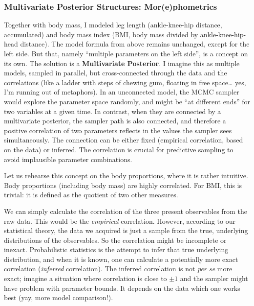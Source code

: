 \subsubsection{Multivariate Posterior Structures: Mor(e)phometrics}
\label{sec:orgf2c37c2}
Together with body mass, I modeled leg length (ankle-knee-hip distance, accumulated) and body mass index (BMI, body mass divided by ankle-knee-hip-head distance).
The model formula from above remains unchanged, except for the left side.
But that, namely ``multiple parameters on the left side'', is a concept on its own.
The solution is a \textbf{Multivariate Posterior}.
I imagine this as multiple models, sampled in parallel, but cross-connected through the data and the correlations (like a ladder with steps of chewing gum, floating in free space\ldots{} yes, I'm running out of metaphors).
In an unconnected model, the MCMC sampler would explore the parameter space randomly, and might be ``at different ends'' for two variables at a given time.
In contrast, when they are connected by a multivariate posterior, the sampler path is also connected, and therefore a positive correlation of two parameters reflects in the values the sampler sees simultaneously.
The connection can be either fixed (empirical correlation, based on the data) or inferred.
The correlation is crucial for predictive sampling to avoid implausible parameter combinations.


Let us rehearse this concept on the body proportions, where it is rather intuitive.
Body proportions (including body mass) are highly correlated.
For BMI, this is trivial: it is defined as the quotient of two other measures.

We can simply calculate the correlation of the three present observables from the raw data.
This would be the \emph{empirical} correlation.
However, according to our statistical theory, the data we acquired is just a sample from the true, underlying distributions of the observables.
So the correlation might be incomplete or inexact.
Probabilistic statistics is the attempt to infer that true underlying distribution, and when it is known, one can calculate a potentially more exact correlation (\emph{inferred} correlation).
The inferred correlation is not \emph{per se} more exact; imagine a situation where correlation is close to \(\pm 1\) and the sampler might have problem with parameter bounds.
It depends on the data which one works best (yay, more model comparison!).


